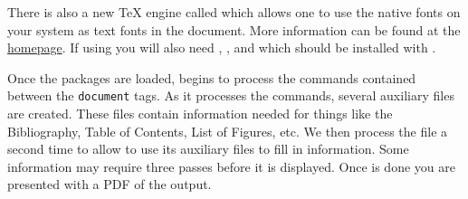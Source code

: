 There is also a new \TeX{} engine called \xt which allows one to use the native fonts on your system as text fonts in the document. More information can be found at the \href{http://scripts.sil.org/cms/scripts/page.php?site_id=nrsi&id=xetex}{\xt homepage}. If using \xt you will also need , , and  which should be installed with \xt.

Once the packages are loaded, \lt begins to process the commands contained between the \texttt{document} tags. As it processes the commands, several auxiliary files are created. These files contain information needed for things like the Bibliography, Table of Contents, List of Figures, etc. We then process the file a second time to allow \lt to use its auxiliary files to fill in information. Some information may require three passes before it is displayed. Once \lt is done you are presented with a PDF of the output.